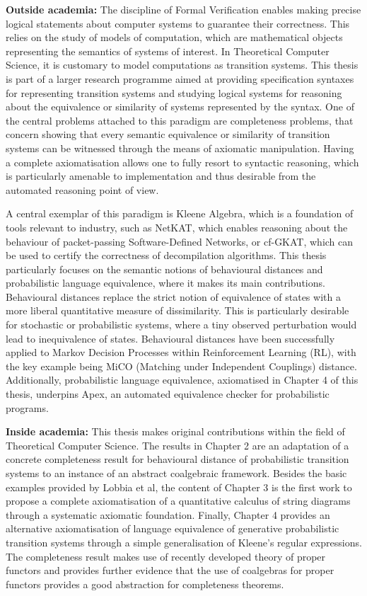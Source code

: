 \begin{impactstatement}
\textbf{Outside academia:} The discipline of Formal Verification enables making precise logical statements about computer systems to guarantee their correctness. This relies on the study of models of computation, which are mathematical objects representing the semantics of systems of interest. In Theoretical Computer Science, it is customary to model computations as transition systems. This thesis is part of a larger research programme aimed at providing specification syntaxes for representing transition systems and studying logical systems for reasoning about the equivalence or similarity of systems represented by the syntax. One of the central problems attached to this paradigm are completeness problems, that concern showing that every semantic equivalence or similarity of transition systems can be witnessed through the means of axiomatic manipulation. Having a complete axiomatisation allows one to fully resort to syntactic reasoning, which is particularly amenable to implementation and thus desirable from the automated reasoning point of view. 

A central exemplar of this paradigm is Kleene Algebra, which is a foundation of tools relevant to industry, such as NetKAT, which enables reasoning about the behaviour of packet-passing Software-Defined Networks, or cf-GKAT, which can be used to certify the correctness of decompilation algorithms. This thesis particularly focuses on the semantic notions of behavioural distances and probabilistic language equivalence, where it makes its main contributions. Behavioural distances replace the strict notion of equivalence of states with a more liberal quantitative measure of dissimilarity. This is particularly desirable for stochastic or probabilistic systems, where a tiny observed perturbation would lead to inequivalence of states. Behavioural distances have been successfully applied to Markov Decision Processes within Reinforcement Learning (RL), with the key example being MiCO (Matching under Independent Couplings) distance. Additionally, probabilistic language equivalence, axiomatised in Chapter 4 of this thesis, underpins Apex, an automated equivalence checker for probabilistic programs.

\textbf{Inside academia:} This thesis makes original contributions within the field of Theoretical Computer Science. The results in Chapter 2 are an adaptation of a concrete completeness result for behavioural distance of probabilistic transition systems to an instance of an abstract coalgebraic framework. Besides the basic examples provided by Lobbia et al, the content of Chapter 3 is the first work to propose a complete axiomatisation of a quantitative calculus of string diagrams through a systematic axiomatic foundation. Finally, Chapter 4 provides an alternative axiomatisation of language equivalence of generative probabilistic transition systems through a simple generalisation of Kleene’s regular expressions. The completeness result makes use of recently developed theory of proper functors and provides further evidence that the use of coalgebras for proper functors provides a good abstraction for completeness theorems.


\end{impactstatement}
